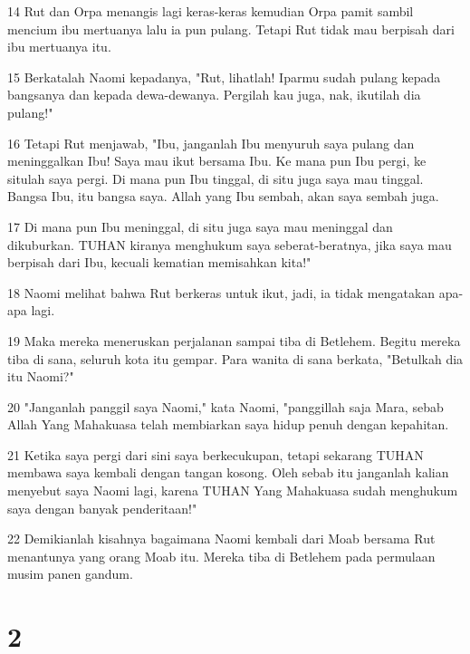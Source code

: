 \par 14 Rut dan Orpa menangis lagi keras-keras kemudian Orpa pamit sambil mencium ibu mertuanya lalu ia pun pulang. Tetapi Rut tidak mau berpisah dari ibu mertuanya itu.
\par 15 Berkatalah Naomi kepadanya, "Rut, lihatlah! Iparmu sudah pulang kepada bangsanya dan kepada dewa-dewanya. Pergilah kau juga, nak, ikutilah dia pulang!"
\par 16 Tetapi Rut menjawab, "Ibu, janganlah Ibu menyuruh saya pulang dan meninggalkan Ibu! Saya mau ikut bersama Ibu. Ke mana pun Ibu pergi, ke situlah saya pergi. Di mana pun Ibu tinggal, di situ juga saya mau tinggal. Bangsa Ibu, itu bangsa saya. Allah yang Ibu sembah, akan saya sembah juga.
\par 17 Di mana pun Ibu meninggal, di situ juga saya mau meninggal dan dikuburkan. TUHAN kiranya menghukum saya seberat-beratnya, jika saya mau berpisah dari Ibu, kecuali kematian memisahkan kita!"
\par 18 Naomi melihat bahwa Rut berkeras untuk ikut, jadi, ia tidak mengatakan apa-apa lagi.
\par 19 Maka mereka meneruskan perjalanan sampai tiba di Betlehem. Begitu mereka tiba di sana, seluruh kota itu gempar. Para wanita di sana berkata, "Betulkah dia itu Naomi?"
\par 20 "Janganlah panggil saya Naomi," kata Naomi, "panggillah saja Mara, sebab Allah Yang Mahakuasa telah membiarkan saya hidup penuh dengan kepahitan.
\par 21 Ketika saya pergi dari sini saya berkecukupan, tetapi sekarang TUHAN membawa saya kembali dengan tangan kosong. Oleh sebab itu janganlah kalian menyebut saya Naomi lagi, karena TUHAN Yang Mahakuasa sudah menghukum saya dengan banyak penderitaan!"
\par 22 Demikianlah kisahnya bagaimana Naomi kembali dari Moab bersama Rut menantunya yang orang Moab itu. Mereka tiba di Betlehem pada permulaan musim panen gandum.

\chapter{2}

